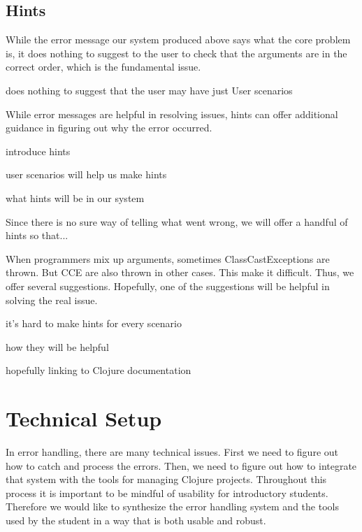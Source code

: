 \documentclass[12pt]{article}
\newcommand{\comment}[1]{{\bf \tt  {#1}}}
\newcommand{\emcomment}[1]{\textcolor{ForestGreen}{\comment{Elena: {#1}}}}
\begin{document}

\subsection{Hints}\label{sec:hints}

While the error message our system produced above says what the core problem is, it does nothing to suggest to the user to check that the arguments are in the correct order, which is the fundamental issue. 


does nothing to suggest that the user may have just 
User scenarios

While error messages are helpful in resolving issues, hints can offer additional guidance in figuring out why the error occurred. 

introduce hints

user scenarios will help us make hints

what hints will be in our system

Since there is no sure way of telling what went wrong, we will offer a handful of hints so that...

When programmers mix up arguments, sometimes ClassCastExceptions are thrown. But CCE are also thrown in other cases. This make it difficult. Thus, we offer several suggestions. Hopefully, one of the suggestions will be helpful in solving the real issue.

it's hard to make hints for every scenario

how they will be helpful

hopefully linking to Clojure documentation

\section{Technical Setup}\label{sec:technical}
In error handling, there are many technical issues. First we need to figure out how to catch and process the errors. Then, we need to figure out how to integrate that system with the tools for managing Clojure projects. Throughout this process it is important to be mindful of usability for introductory students. Therefore we would like to synthesize the error handling system and the tools used by the student in a way that is both usable and robust.
\end{document}
